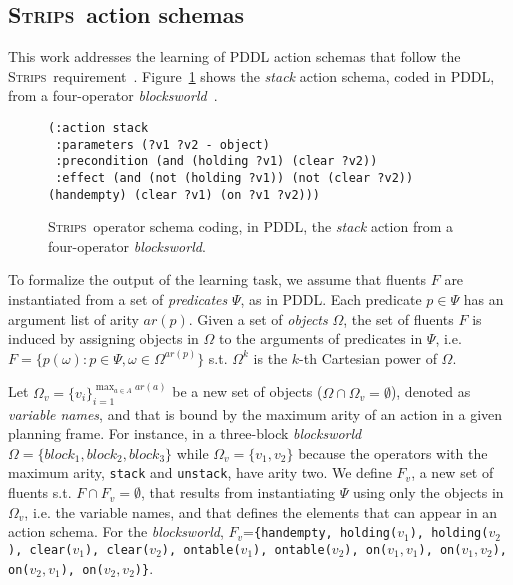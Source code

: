 \documentclass[3p,times]{elsarticle}
\newcommand{\strips}{\textsc{Strips}}     %
\begin{document}
\subsection{\strips\ action schemas}
This work addresses the learning of PDDL action schemas that follow the \strips\ requirement~\cite{mcdermott1998pddl,fox2003pddl2}. Figure~\ref{fig:stack} shows the {\em stack} action schema, coded in PDDL, from a four-operator {\em blocksworld}~\cite{slaney2001blocks}.

\begin{figure}[hbt!]
\begin{footnotesize}
\begin{verbatim}
(:action stack
 :parameters (?v1 ?v2 - object)
 :precondition (and (holding ?v1) (clear ?v2))
 :effect (and (not (holding ?v1)) (not (clear ?v2)) (handempty) (clear ?v1) (on ?v1 ?v2)))
\end{verbatim}
\end{footnotesize}
 \caption{\small \strips\ operator schema coding, in PDDL, the {\em stack} action from a four-operator {\em blocksworld}.}
\label{fig:stack}
\end{figure}

To formalize the output of the learning task, we assume that fluents $F$ are instantiated from a set of {\em predicates} $\Psi$, as in PDDL. Each predicate $p\in\Psi$ has an argument list of arity $ar(p)$. Given a set of {\em objects} $\Omega$, the set of fluents $F$ is induced by assigning objects in $\Omega$ to the arguments of predicates in $\Psi$, i.e.~$F=\{p(\omega):p\in\Psi,\omega\in\Omega^{ar(p)}\}$ s.t. $\Omega^k$ is the $k$-th Cartesian power of $\Omega$.

Let $\Omega_v=\{v_i\}_{i=1}^{\operatorname*{max}_{a\in A} ar(a)}$ be a new set of objects ($\Omega\cap\Omega_v=\emptyset$), denoted as {\em variable names}, and that is bound by the maximum arity of an action in a given planning frame. For instance, in a three-block {\em blocksworld} $\Omega=\{block_1, block_2, block_3\}$ while $\Omega_v=\{v_1, v_2\}$ because the operators with the maximum arity, {\small\tt stack} and {\small\tt unstack}, have arity two. We define $F_v$, a new set of fluents s.t. $F\cap F_v=\emptyset$, that results from instantiating $\Psi$ using only the objects in $\Omega_v$, i.e. the variable names, and that defines the elements that can appear in an action schema. For the {\em blocksworld}, $F_v$={\small\tt\{handempty, holding($v_1$), holding($v_2$), clear($v_1$), clear($v_2$), ontable($v_1$), ontable($v_2$), on($v_1,v_1$), on($v_1,v_2$), on($v_2,v_1$), on($v_2,v_2$)\}}.
\end{document}
